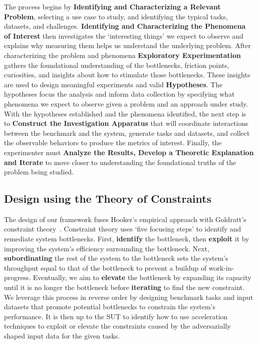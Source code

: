 

The process begins by \textbf{Identifying and Characterizing a Relevant Problem}, selecting a use case to study, and identifying the typical tasks, datasets, and challenges. 
\textbf{Identifying and Characterizing the Phenomena of Interest} then investigates the `interesting things' we expect to observe and explains why measuring them helps us understand the underlying problem.
After characterizing the problem and phenomena \textbf{Exploratory Experimentation} gathers the foundational understanding of the bottlenecks, friction points, curiosities, and insights about how to stimulate those bottlenecks.
These insights are used to design meaningful experiments and valid \textbf{Hypotheses}.
The hypotheses focus the analysis and inform data collection by specifying what phenomena we expect to observe given a problem and an approach under study.
With the hypotheses established and the phenomena identified, the next step is to \textbf{Construct the Investigation Apparatus} that will coordinate interactions between the benchmark and the system, generate tasks and datasets, and collect the observable behaviors to produce the metrics of interest.
Finally, the experimenter must \textbf{Analyze the Results, Develop a Theoretic Explanation and Iterate} to move closer to understanding the foundational truths of the problem being studied.

\subsection{Design using the Theory of Constraints}

The design of our \gai framework fuses Hooker's empirical approach with Goldratt's constraint theory~\cite{Goldratt1990, Goldratt2004}.
Constraint theory uses `five focusing steps' to identify and remediate system bottlenecks. 
First, \textbf{identify} the bottleneck, then \textbf{exploit} it by improving the system's efficiency surrounding the bottleneck.
Next, \textbf{subordinating} the rest of the system to the bottleneck sets the system's throughput equal to that of the bottleneck to prevent a buildup of work-in-progress.
Eventually, we aim to \textbf{elevate} the bottleneck by expanding its capacity until it is no longer the bottleneck before \textbf{iterating} to find the new constraint. 
We leverage this process in reverse order by designing benchmark tasks and input datasets that promote potential bottlenecks to constrain the system's performance. 
It is then up to the \ac{SUT} to identify how to use acceleration techniques to exploit or elevate the constraints caused by the adversarially shaped input data for the given tasks. 

